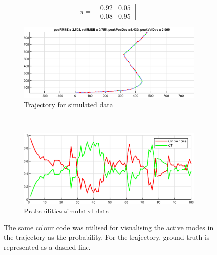 \begin{equation}
    \label{eq:ga_1_2_pi_matrix}
    \pi = \begin{bmatrix}
        0.92 & 0.05 \\
        0.08 & 0.95
    \end{bmatrix}
\end{equation}

\begin{figure}[ht]
    \centering
    \begin{subfigure}[h]{0.4\textwidth}
        \includegraphics[width=\textwidth]{figures/ga_1/2_estimated_trajectory}
        \caption{Trajectory for simulated data}
        \label{fig:ga_1_2_estimated_trajectory}
    \end{subfigure}%
    ~
    \begin{subfigure}[h]{0.4\textwidth}
        \includegraphics[width=\textwidth]{figures/ga_1/2_probs}
        \caption{Probabilities simulated data}
        \label{fig:ga_1_2_probabilities}
    \end{subfigure}
    \caption{The same colour code was utilised for visualising the active modes in the trajectory as the probability. For the trajectory, ground truth is represented as a dashed line. }
    \label{fig:ga_1_2_traj_and_probs} 
\end{figure}

